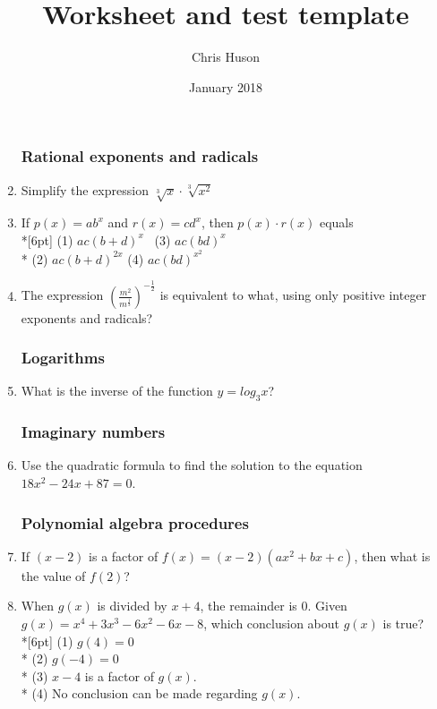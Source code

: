 \documentclass[12pt, oneside]{article}
\title{Worksheet and test template}
\author{Chris Huson}
\date{January 2018}
\begin{document}
\begin{enumerate}
\subsubsection*{Rational exponents and radicals}

\item Simplify the expression $\sqrt[3]{x} \cdot \sqrt[3]{x^2}$

\item If $p(x)=ab^x$ and $r(x)=cd^x$, then $p(x) \cdot r(x)$ equals \\*[6pt]
(1) $ac(b+d)^x$ \, \qquad (3) $ac(bd)^x$\\* 
(2) $ac(b+d)^{2x}$ \qquad (4) $ac(bd)^{x^2}$


\item The expression $\displaystyle \left( \frac{m^2}{m^{\frac{1}{3}}} \right)^{-\frac{1}{2}}$ is equivalent to what, using only positive integer exponents and radicals?

\subsubsection*{Logarithms}
\item What is the inverse of the function $y=log_3 x$?


\subsubsection*{Imaginary numbers}
\item Use the quadratic formula to find the solution to the equation $18x^2-24x+87=0$.


\subsubsection*{Polynomial algebra procedures}

\item If $(x-2)$ is a factor of $f(x)=(x-2)(ax^2+bx+c)$, then what is the value of $f(2)$?

\item When $g(x)$ is divided by $x+4$, the remainder is 0. Given $g(x)=x^4+3x^3- 6x^2- 6x-8$, which conclusion about $g(x)$ is true?\\*[6pt]
(1) $g(4)=0$ \\*
(2) $g(-4)=0$ \\*
(3) $x-4$ is a factor of $g(x)$.\\*
(4) No conclusion can be made regarding $g(x)$.


\end{enumerate}
\end{document}
